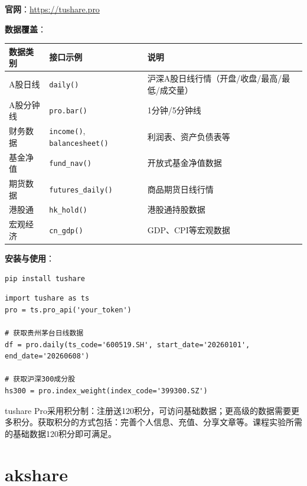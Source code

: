 \textbf{官网}：\url{https://tushare.pro}

\textbf{数据覆盖}：

\begin{table}[H]
\centering
\small
\begin{tabular}{llp{6cm}}
\toprule
\textbf{数据类别} & \textbf{接口示例} & \textbf{说明} \\
\midrule
A股日线 & \texttt{daily()} & 沪深A股日线行情（开盘/收盘/最高/最低/成交量） \\
A股分钟线 & \texttt{pro.bar()} & 1分钟/5分钟线 \\
财务数据 & \texttt{income()}, \texttt{balancesheet()} & 利润表、资产负债表等 \\
基金净值 & \texttt{fund\_nav()} & 开放式基金净值数据 \\
期货数据 & \texttt{futures\_daily()} & 商品期货日线行情 \\
港股通 & \texttt{hk\_hold()} & 港股通持股数据 \\
宏观经济 & \texttt{cn\_gdp()} & GDP、CPI等宏观数据 \\
\bottomrule
\end{tabular}
\end{table}

\textbf{安装与使用}：

\begin{lstlisting}[style=shell]
pip install tushare
\end{lstlisting}

\begin{lstlisting}[style=python]
import tushare as ts
pro = ts.pro_api('your_token')

# 获取贵州茅台日线数据
df = pro.daily(ts_code='600519.SH', start_date='20260101', end_date='20260608')

# 获取沪深300成分股
hs300 = pro.index_weight(index_code='399300.SZ')
\end{lstlisting}

\begin{notebox}[tushare积分]
tushare Pro采用积分制：注册送120积分，可访问基础数据；更高级的数据需要更多积分。获取积分的方式包括：完善个人信息、充值、分享文章等。课程实验所需的基础数据120积分即可满足。
\end{notebox}

\section{akshare}

